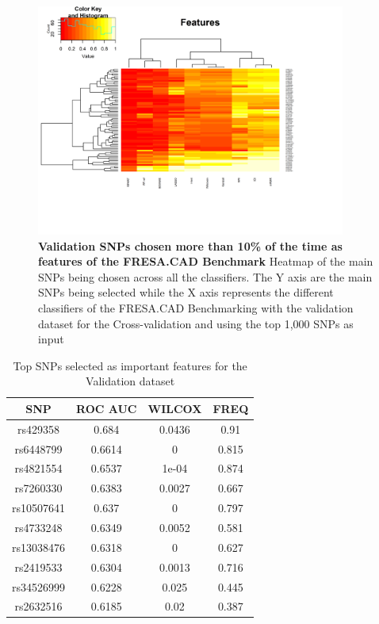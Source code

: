 \begin{figure}[!ht]
\centerline{\includegraphics[width=4in]{images/results/fresaSNPsVal.png}}
\caption{{\bf Validation SNPs chosen more than 10\% of the time as features of the FRESA.CAD Benchmark} 
Heatmap of the main SNPs being chosen across all the classifiers. The Y axis are the main SNPs being selected while the X axis represents the different classifiers of the FRESA.CAD Benchmarking with the validation dataset for the Cross-validation and using the top 1,000 SNPs as input}
\label{fig23}
\end{figure}

\begin{table}[ht!]
    \begin{center}
        \begin{tabular}{|c|c|c|c|}
        \hline
        \textbf{SNP}   &  \textbf{ROC AUC} &  \textbf{WILCOX} &  \textbf{FREQ} \\ \hline
rs429358   &	0.684 &	0.0436 &	0.91 \\ \hline
rs6448799  &	0.6614 &	0 &	0.815 \\ \hline
rs4821554	&	0.6537 &	1e-04 &	0.874 \\ \hline
rs7260330	&	0.6383 &	0.0027 &	0.667 \\ \hline
rs10507641	&	0.637 &	0 &	0.797 \\ \hline
rs4733248	&	0.6349 &	0.0052 &	0.581 \\ \hline
rs13038476	&	0.6318 &	0 &	0.627 \\ \hline
rs2419533	&	0.6304 &	0.0013 &	0.716 \\ \hline
rs34526999	&	0.6228 &	0.025 &	0.445 \\ \hline
rs2632516	&	0.6185 &	0.02 &	0.387 \\ \hline
        \end{tabular}
    \end{center}
  \caption{Top  SNPs selected as important features for the Validation dataset}
  \label{topsnps2}
\end{table}

